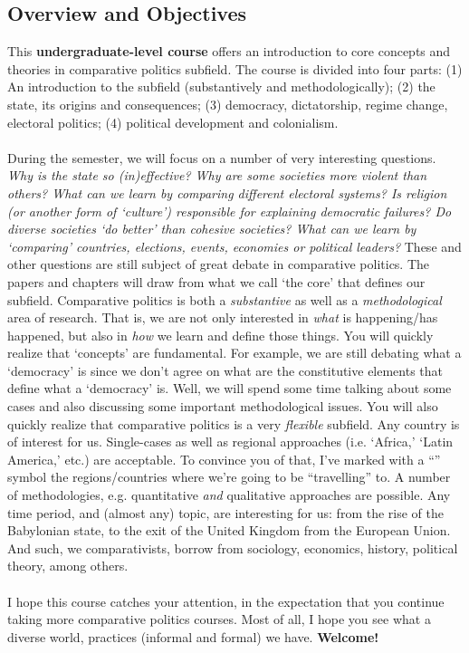 \documentclass[letterpaper]{article}
\begin{document}
\subsection*{Overview and Objectives}

This {\bf {\color{blue}undergraduate-level course}} offers an introduction to core concepts and theories in comparative politics subfield. The course is divided into four parts: (1) An introduction to the subfield  (substantively and methodologically); (2) the state, its origins and consequences; (3) democracy, dictatorship, regime change, electoral politics; (4) political development and colonialism.
\\
\\
During the semester, we will focus on a number of very interesting questions. \emph{Why is the state so (in)effective? Why are some societies more violent than others? What can we learn by comparing different electoral systems? Is religion (or another form of `culture') responsible for explaining democratic failures? Do diverse societies `do better' than cohesive societies? What can we learn by `comparing' countries, elections, events, economies or political leaders?} These and other questions are still subject of great debate in comparative politics. The papers and chapters will draw from what we call `the core' that defines our subfield. Comparative politics is both a \emph{substantive} as well as a \emph{methodological} area of research. That is, we are not only interested in \emph{what} is happening/has happened, but also in \emph{how} we learn and define those things. You will quickly realize that `concepts' are fundamental. For example, we are still debating what a `democracy' is since we don't agree on what are the constitutive elements that define what a `democracy' is. Well, we will spend some time talking about some cases and also discussing some important methodological issues. You will also quickly realize that comparative politics is a very \emph{flexible} subfield. Any country is of interest for us. Single-cases as well as regional approaches (i.e. `Africa,' `Latin America,' etc.) are acceptable. To convince you of that, I've marked with a ``{\color{brown}\faGlobe}'' symbol the regions/countries where we're going to be ``travelling'' to. A number of methodologies, e.g. quantitative \emph{and} qualitative approaches are possible. Any time period, and (almost any) topic, are interesting for us: from the rise of the Babylonian state, to the exit of the United Kingdom from the European Union. And such, we comparativists, borrow from sociology, economics, history, political theory, among others. 
\\
\\
I hope this course catches your attention, in the expectation that you continue taking more comparative politics courses. Most of all, I hope you see what a diverse world, practices (informal and formal) we have. {\bf Welcome!}
\end{document}
